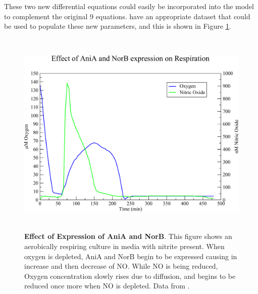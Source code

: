 These two new differential equations could easily be incorporated into the model to complement the original 9 equations. \citet{Rock2005} have an appropriate dataset that could be used to populate these new parameters, and this is shown in Figure \ref{fig:expression}.

\begin{figure}[tbp]
 \centering
 \includegraphics[height=10cm]{./08-expression/data/expression.pdf}
 \caption[Effect of Expression of AniA and NorB]{{\bf Effect of Expression of AniA and NorB}. This figure shows an aerobically respiring culture in media with nitrite present. When oxygen is depleted, AniA and NorB begin to be expressed causing in increase and then decrease of NO. While NO is being reduced, Oxygen concentration slowly rises due to diffusion, and begins to be reduced once more when NO is depleted. Data from \citet{Rock2005}.
 \label{fig:expression}}
\end{figure}